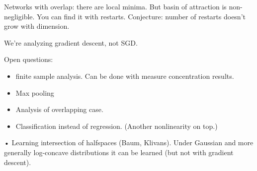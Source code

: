 Networks with overlap: there are local minima. But basin of attraction is non-negligible. You can find it with restarts. Conjecture: number of restarts doesn't grow with dimension.

We're analyzing gradient descent,  not SGD.


Open questions: 
\begin{itemize}
\item
finite sample analysis. Can be done with measure concentration results.
\item
Max pooling
\item
Analysis of overlapping case.
\item
Classification instead of regression. (Another nonlinearity on top.)
\end{itemize}•
Learning intersection of halfspaces (Baum, Klivans). Under Gaussian and more generally log-concave distributions it can be learned (but not with gradient descent). 



